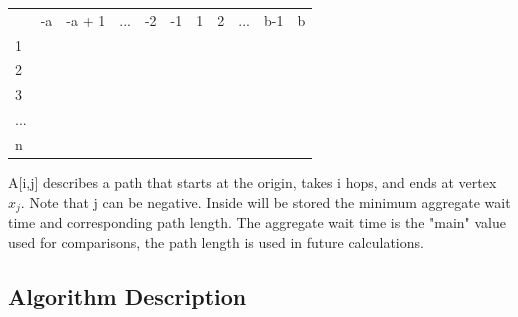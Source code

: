 \documentclass[a4paper]{article}
\begin{document}
\begin{table}[htb]
\centering
\begin{tabular}{lllllllllll}
                         & -a                    & -a + 1                & ...                   & -2                    & -1                    & 1                     & 2                     & ...                   & b-1                   & b                     \\ \cline{2-11} 
\multicolumn{1}{l|}{1}   & \multicolumn{1}{l|}{} & \multicolumn{1}{l|}{} & \multicolumn{1}{l|}{} & \multicolumn{1}{l|}{} & \multicolumn{1}{l|}{} & \multicolumn{1}{l|}{} & \multicolumn{1}{l|}{} & \multicolumn{1}{l|}{} & \multicolumn{1}{l|}{} & \multicolumn{1}{l|}{} \\ \cline{2-11} 
\multicolumn{1}{l|}{2}   & \multicolumn{1}{l|}{} & \multicolumn{1}{l|}{} & \multicolumn{1}{l|}{} & \multicolumn{1}{l|}{} & \multicolumn{1}{l|}{} & \multicolumn{1}{l|}{} & \multicolumn{1}{l|}{} & \multicolumn{1}{l|}{} & \multicolumn{1}{l|}{} & \multicolumn{1}{l|}{} \\ \cline{2-11} 
\multicolumn{1}{l|}{3}   & \multicolumn{1}{l|}{} & \multicolumn{1}{l|}{} & \multicolumn{1}{l|}{} & \multicolumn{1}{l|}{} & \multicolumn{1}{l|}{} & \multicolumn{1}{l|}{} & \multicolumn{1}{l|}{} & \multicolumn{1}{l|}{} & \multicolumn{1}{l|}{} & \multicolumn{1}{l|}{} \\ \cline{2-11} 
\multicolumn{1}{l|}{...} & \multicolumn{1}{l|}{} & \multicolumn{1}{l|}{} & \multicolumn{1}{l|}{} & \multicolumn{1}{l|}{} & \multicolumn{1}{l|}{} & \multicolumn{1}{l|}{} & \multicolumn{1}{l|}{} & \multicolumn{1}{l|}{} & \multicolumn{1}{l|}{} & \multicolumn{1}{l|}{} \\ \cline{2-11} 
\multicolumn{1}{l|}{n}   & \multicolumn{1}{l|}{} & \multicolumn{1}{l|}{} & \multicolumn{1}{l|}{} & \multicolumn{1}{l|}{} & \multicolumn{1}{l|}{} & \multicolumn{1}{l|}{} & \multicolumn{1}{l|}{} & \multicolumn{1}{l|}{} & \multicolumn{1}{l|}{} & \multicolumn{1}{l|}{} \\ \cline{2-11} 
\end{tabular}
\end{table}

A[i,j] describes a path that starts at the origin,  takes i hops, and ends at vertex $x_j$. Note that j can be negative. Inside will be stored the minimum aggregate wait time and corresponding path length. The aggregate wait time is the "main" value used for comparisons, the path length is used in future calculations.

\subsection{Algorithm Description}
\end{document}
